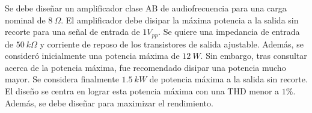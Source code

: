 Se debe diseñar un amplificador clase AB de audiofrecuencia para una carga nominal de $8 \ \Omega$. El amplificador debe disipar la máxima potencia a la salida sin recorte para una señal de entrada de $1 V_{pp}$. Se quiere una impedancia de entrada de $50 \ k\Omega$ y corriente de reposo de los transistores de salida ajustable. Además, se consideró inicialmente una potencia máxima de $12 \ W$. Sin embargo, tras consultar acerca de la potencia máxima, fue recomendado disipar una potencia mucho mayor. Se considera finalmente $1.5 \ kW$ de potencia máxima a la salida sin recorte. El diseño se centra en lograr esta potencia máxima con una THD menor a $1\%$. Además, se debe diseñar para maximizar el rendimiento.
